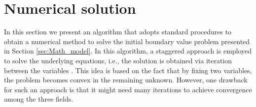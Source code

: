 \section{Numerical solution}\label{sec:Num_Sol}
In this section we present an algorithm that adopts standard procedures to obtain a numerical method to solve the initial boundary value problem presented in Section \ref{sec:Math_model}. %
In this algorithm, a staggered approach is employed to solve the underlying equations, i.e., the solution is obtained via iteration between the variables \cite{Bourdin2000797,bourdin2008variational}. This idea is based on the fact that by fixing two variables, the problem becomes convex in the remaining unknown. However, one drawback for such an approach is that it might need many iterations to achieve convergence among the three fields.

